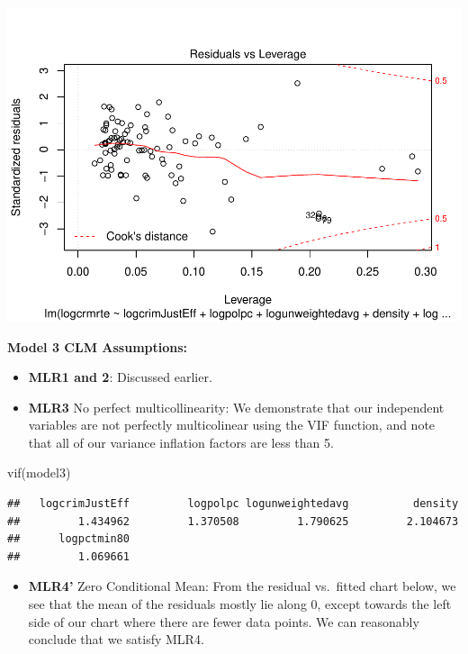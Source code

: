 \documentclass[]{article}
\newenvironment{Shaded}{}{}
\newcommand{\KeywordTok}[1]{\textcolor[rgb]{0.00,0.00,1.00}{#1}}
\newcommand{\NormalTok}[1]{#1}
\providecommand{\tightlist}{%
  \setlength{\itemsep}{0pt}\setlength{\parskip}{0pt}}
\begin{document}
\includegraphics{Bagnard_Gaustad_Hartman_Leung_Lab_3_files/figure-latex/unnamed-chunk-97-1.pdf}

\textbf{Model 3 CLM Assumptions:}

\begin{itemize}
\item
  \textbf{MLR1 and 2}: Discussed earlier.
\item
  \textbf{MLR3} No perfect multicollinearity: We demonstrate that our
  independent variables are not perfectly multicolinear using the VIF
  function, and note that all of our variance inflation factors are less
  than 5.
\end{itemize}

\begin{Shaded}
\begin{Highlighting}[]
\KeywordTok{vif}\NormalTok{(model3)}
\end{Highlighting}
\end{Shaded}

\begin{verbatim}
##   logcrimJustEff         logpolpc logunweightedavg          density 
##         1.434962         1.370508         1.790625         2.104673 
##      logpctmin80 
##         1.069661
\end{verbatim}

\begin{itemize}
\tightlist
\item
  \textbf{MLR4'} Zero Conditional Mean: From the residual vs.~fitted
  chart below, we see that the mean of the residuals mostly lie along 0,
  except towards the left side of our chart where there are fewer data
  points. We can reasonably conclude that we satisfy MLR4.
\end{itemize}
\end{document}
